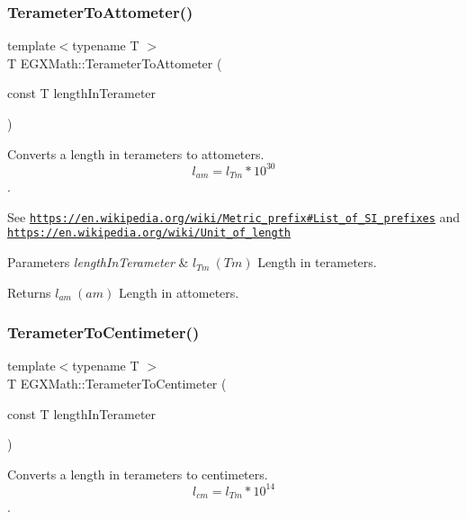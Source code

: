\subsubsection{\texorpdfstring{Terameter\+To\+Attometer()}{TerameterToAttometer()}}
{\footnotesize\ttfamily template$<$typename T $>$ \\
T E\+G\+X\+Math\+::\+Terameter\+To\+Attometer (\begin{DoxyParamCaption}\item[{const T}]{length\+In\+Terameter }\end{DoxyParamCaption})}



Converts a length in terameters to attometers. \[ l_{am}=l_{Tm} * 10^{30} \]. 

See \href{https://en.wikipedia.org/wiki/Metric_prefix#List_of_SI_prefixes}{\tt https\+://en.\+wikipedia.\+org/wiki/\+Metric\+\_\+prefix\#\+List\+\_\+of\+\_\+\+S\+I\+\_\+prefixes} and \href{https://en.wikipedia.org/wiki/Unit_of_length}{\tt https\+://en.\+wikipedia.\+org/wiki/\+Unit\+\_\+of\+\_\+length} 
\begin{DoxyParams}{Parameters}
{\em length\+In\+Terameter} & $ l_{Tm}\ (Tm)$ Length in terameters. \\
\hline
\end{DoxyParams}
\begin{DoxyReturn}{Returns}
$ l_{am}\ (am)$ Length in attometers. 
\end{DoxyReturn}
\mbox{\label{group___e_g_x_math-_conversions-_length_conversions-_s_i-_terameter-_s_i_gad280a7bb7ff83217a496db8168c27ee9}} 
\subsubsection{\texorpdfstring{Terameter\+To\+Centimeter()}{TerameterToCentimeter()}}
{\footnotesize\ttfamily template$<$typename T $>$ \\
T E\+G\+X\+Math\+::\+Terameter\+To\+Centimeter (\begin{DoxyParamCaption}\item[{const T}]{length\+In\+Terameter }\end{DoxyParamCaption})}



Converts a length in terameters to centimeters. \[ l_{cm}=l_{Tm} * 10^{14} \]. 

